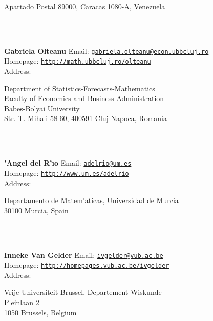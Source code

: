 \documentclass[a4paper,11pt]{report}
\begin{document}
\begin{titlepage}
{\begin{minipage}[t]{8cm}
 Apartado Postal 89000, Caracas 1080-A, Venezuela \end{minipage}
}\\
{\mbox{}\\
\small \noindent \textbf{Gabriela Olteanu    }  Email: \href{mailto://gabriela.olteanu@econ.ubbcluj.ro} {\texttt{gabriela.olteanu@econ.ubbcluj.ro}}\\
  Homepage: \href{http://math.ubbcluj.ro/~olteanu} {\texttt{http://math.ubbcluj.ro/\texttt{}olteanu}}\\
  Address: \begin{minipage}[t]{8cm}\noindent
 Department of Statistics-Forecasts-Mathematics\\
 Faculty of Economics and Business Administration\\
 Babes-Bolyai University\\
 Str. T. Mihali 58-60, 400591 Cluj-Napoca, Romania \end{minipage}
}\\
{\mbox{}\\
\small \noindent \textbf{{\a'A}ngel del R{\a'\i}o    }  Email: \href{mailto://adelrio@um.es} {\texttt{adelrio@um.es}}\\
  Homepage: \href{http://www.um.es/adelrio} {\texttt{http://www.um.es/adelrio}}\\
  Address: \begin{minipage}[t]{8cm}\noindent
 Departamento de Matem{\a'a}ticas, Universidad de Murcia\\
 30100 Murcia, Spain \end{minipage}
}\\
{\mbox{}\\
\small \noindent \textbf{Inneke Van Gelder    }  Email: \href{mailto://ivgelder@vub.ac.be} {\texttt{ivgelder@vub.ac.be}}\\
  Homepage: \href{http://homepages.vub.ac.be/~ivgelder} {\texttt{http://homepages.vub.ac.be/\texttt{}ivgelder}}\\
  Address: \begin{minipage}[t]{8cm}\noindent
 Vrije Universiteit Brussel, Departement Wiskunde \\
 Pleinlaan 2 \\
 1050 Brussels, Belgium \end{minipage}
}\\
\end{titlepage}
\end{document}
